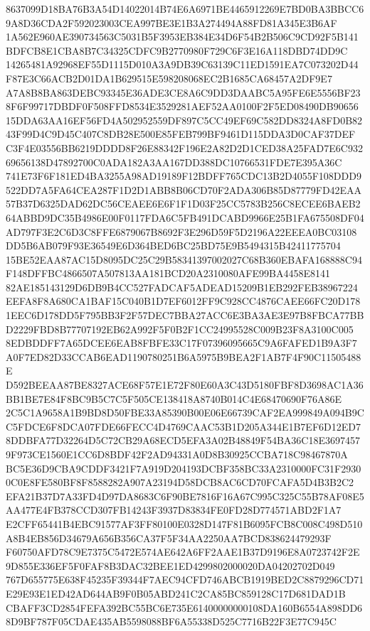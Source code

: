 \documentclass[UTF8,fontset=fandol,zihao=-4,a4paper]{ctexart}
\begin{document}
{{8637099D18BA76B3A54D14022014B74E6A6971BE4465912269E7BD0BA3BBCC69A8D36CDA2F592023003CEA997BE3E1B3A274494A88FD81A345E3B6AF
1A562E960AE390734563C5031B5F3953EB384E34D6F54B2B506C9CD92F5B141BDFCB8E1CBA8B7C34325CDFC9B2770980F729C6F3E16A118DBD74DD9C
14265481A92968EF55D1115D010A3A9DB39C63139C11ED1591EA7C073202D44F87E3C66ACB2D01DA1B629515E598208068EC2B1685CA68457A2DF9E7
A7A8B8BA863DEBC93345E36ADE3CE8A6C9DD3DAABC5A95FE6E5556BF238F6F99717DBDF0F508FFD8534E3529281AEF52AA0100F2F5ED08490DB90656
15DDA63AA16EF56FD4A502952559DF897C5CC49EF69C582DD8324A8FD0B8243F99D4C9D45C407C8DB28E500E85FEB799BF9461D115DDA3D0CAF37DEF
C3F4E03556BB6219DDDD8F26E88342F196E2A82D2D1CED38A25FAD7E6C93269656138D47892700C0ADA182A3AA167DD388DC10766531FDE7E395A36C
741E73F6F181ED4BA3255A98AD19189F12BDFF765CDC13B2D4055F108DDD9522DD7A5FA64CEA287F1D2D1ABB8B06CD70F2ADA306B85D87779FD42EAA
57B37D6325DAD62DC56CEAEE6E6F1F1D03F25CC5783B256C8ECEE6BAEB264ABBD9DC35B4986E00F0117FDA6C5FB491DCABD9966E25B1FA675508DF04
AD797F3E2C6D3C8FFE6879067B8692F3E296D59F5D2196A22EEEA0BC03108DD5B6AB079F93E36549E6D364BED6BC25BD75E9B5494315B42411775704
15BE52EAA87AC15D8095DC25C29B58341397002027C68B360EBAFA168888C94F148DFFBC4866507A507813AA181BCD20A2310080AFE99BA4458E8141
82AE185143129D6DB9B4CC527FADCAF5ADEAD15209B1EB292FEB38967224EEFA8F8A680CA1BAF15C040B1D7EF6012FF9C928CC4876CAEE66FC20D178
1EEC6D178DD5F795BB3F2F57DEC7BBA27ACC6E3BA3AE3E97B8FBCA77BBD2229FBD8B77707192EB62A992F5F0B2F1CC24995528C009B23F8A3100C005
8EDBDDFF7A65DCEE6EAB8FBFE33C17F07396095665C9A6FAFED1B9A3F7A0F7ED82D33CCAB6EAD1190780251B6A5975B9BEA2F1AB7F4F90C11505488E
D592BEEAA87BE8327ACE68F57E1E72F80E60A3C43D5180FBF8D3698AC1A36BB1BE7E84F8BC9B5C7C5F505CE138418A8740B014C4E68470690F76A86E
2C5C1A9658A1B9BD8D50FBE33A85390B00E06E66739CAF2EA999849A094B9CC5FDCE6F8DCA07FDE66FECC4D4769CAAC53B1D205A344E1B7EF6D12ED7
8DDBFA77D32264D5C72CB29A68ECD5EFA3A02B48849F54BA36C18E36974579F973CE1560E1CC6D8BDF42F2AD94331A0D8B30925CCBA718C98467870A
BC5E36D9CBA9CDDF3421F7A919D204193DCBF358BC33A2310000FC31F29300C0E8FE580BF8F8588282A907A23194D58DCB8AC6CD70FCAFA5D4B3B2C2
EFA21B37D7A33FD4D97DA8683C6F90BE7816F16A67C995C325C55B78AF08E5AA477E4FB378CCD307FB14243F3937D83834FE0FD28D774571ABD2F1A7
E2CFF65441B4EBC91577AF3FF80100E0328D147F81B6095FCB8C008C498D510A8B4EB856D34679A656B356CA37F5F34AA2250AA7BCD838624479293F
F60750AFD78C9E7375C5472E574AE642A6FF2AAE1B37D9196E8A0723742F2E9D855E336EF5F0FAF8B3DAC32BEE1ED4299802000020DA04202702D049
767D655775E638F45235F39344F7AEC94CFD746ABCB1919BED2C8879296CD71E29E93E1ED42AD644AB9F0B05ABD241C2CA85BC859128C17D681DAD1B
CBAFF3CD2854FEFA392BC55BC6E735E61400000000108DA160B6554A898DD68D9BF787F05CDAE435AB5598088BF6A55338D525C7716B22F3E77C945C
}}
\end{document}
